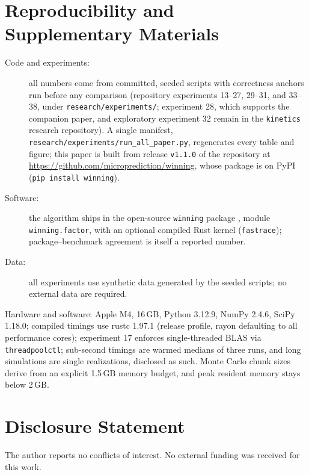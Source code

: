 \documentclass[12pt]{article}
\theoremstyle{remark}
\begin{document}
\section*{Reproducibility and Supplementary Materials}
\sloppy

\begin{description}
\item[Code and experiments:] all numbers come from committed, seeded
scripts with correctness anchors run before any comparison (repository
experiments 13--27, 29--31, and 33--38, under
\texttt{research/experiments/}; experiment 28, which supports the
companion paper, and exploratory experiment 32 remain in the
\texttt{kinetics} research repository). A single manifest,
\texttt{research/experiments/run\_all\_paper.py}, regenerates every
table and figure; this paper is built from release \texttt{v1.1.0}
of the repository at \url{https://github.com/microprediction/winning},
whose package is on PyPI (\texttt{pip install winning}).
\item[Software:] the algorithm ships in the open-source
\texttt{winning} package \citep{winningpkg}, module
\texttt{winning.factor}, with an optional compiled Rust kernel
(\texttt{fastrace}); package--benchmark agreement is itself a reported
number.
\item[Data:] all experiments use synthetic data generated by the seeded
scripts; no external data are required.
\end{description}

Hardware and software: Apple M4, 16\,GB, Python 3.12.9,
NumPy 2.4.6, SciPy 1.18.0; compiled timings use rustc 1.97.1
(release profile, rayon defaulting to all performance cores); experiment 17 enforces single-threaded BLAS via
\texttt{threadpoolctl}; sub-second timings are warmed medians of three
runs, and long simulations are single realizations, disclosed as such.
Monte Carlo chunk sizes derive from an explicit 1.5\,GB memory budget, and
peak resident memory stays below 2\,GB.

\section*{Disclosure Statement}

The author reports no conflicts of interest. No external funding was
received for this work.
\end{document}

